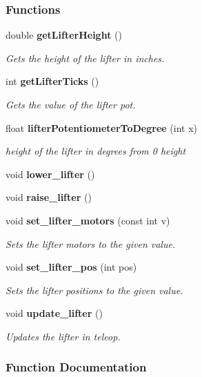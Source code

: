 \subsubsection*{Functions}
\begin{DoxyCompactItemize}
\item 
double \textbf{ get\+Lifter\+Height} ()
\begin{DoxyCompactList}\small\item\em Gets the height of the lifter in inches. \end{DoxyCompactList}\item 
int \textbf{ get\+Lifter\+Ticks} ()
\begin{DoxyCompactList}\small\item\em Gets the value of the lifter pot. \end{DoxyCompactList}\item 
float \textbf{ lifter\+Potentiometer\+To\+Degree} (int x)
\begin{DoxyCompactList}\small\item\em height of the lifter in degrees from 0 height \end{DoxyCompactList}\item 
void \textbf{ lower\+\_\+lifter} ()
\item 
void \textbf{ raise\+\_\+lifter} ()
\item 
void \textbf{ set\+\_\+lifter\+\_\+motors} (const int v)
\begin{DoxyCompactList}\small\item\em Sets the lifter motors to the given value. \end{DoxyCompactList}\item 
void \textbf{ set\+\_\+lifter\+\_\+pos} (int pos)
\begin{DoxyCompactList}\small\item\em Sets the lifter positions to the given value. \end{DoxyCompactList}\item 
void \textbf{ update\+\_\+lifter} ()
\begin{DoxyCompactList}\small\item\em Updates the lifter in teleop. \end{DoxyCompactList}\end{DoxyCompactItemize}


\subsubsection{Function Documentation}
\mbox{\label{lifter_8c_a2719740958fd8a5926f88f6194e820e3}} 
